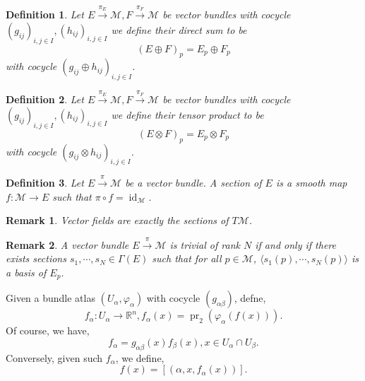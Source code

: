 \documentclass[10pt]{article}
\newtheorem{definition}{Definition}[section]
\newtheorem{remark}{Remark}[section]
\DeclareMathOperator{\pr}{pr}
\DeclareMathOperator{\id}{id}
\newcommand{\R}[0]{\mathbb{R}}
\newcommand{\M}[0]{\mathcal{M}}
\begin{document}
\begin{definition}
  Let $E\stackrel{\pi_E}{\to}\M,F\stackrel{\pi_F}{\to}\M$ be vector bundles with cocycle $(g_{ij})_{i,j\in I},(h_{ij})_{i,j\in I}$ we define their direct sum to be 
  \begin{equation*}
    (E\oplus F)_p = E_p\oplus F_p
  \end{equation*}
  with cocycle $(g_{ij}\oplus h_{ij})_{i,j\in I}$. 
\end{definition}

\begin{definition}
  Let $E\stackrel{\pi_E}{\to}\M,F\stackrel{\pi_F}{\to}\M$ be vector bundles with cocycle $(g_{ij})_{i,j\in I},(h_{ij})_{i,j\in I}$ we define their tensor product to be 
  \begin{equation*}
    (E\otimes F)_p = E_p\otimes F_p
  \end{equation*}
  with cocycle $(g_{ij}\otimes h_{ij})_{i,j\in I}$. 
\end{definition}

\begin{definition}
  Let $E\stackrel{\pi}{\to}\M$ be a vector bundle. A section of $E$ is a smooth map $f:\M\to E$ such that $\pi\circ f = \id_\M$.
\end{definition}

\begin{remark}
  Vector fields are exactly the sections of $T\M$.
\end{remark}

\begin{remark}
  A vector bundle $E\stackrel{\pi}{\to}\M$ is trivial of rank $N$ if and only if there exists sections $s_1,\cdots,s_N\in\Gamma(E)$ such that for all $p\in \M$, $\langle s_1(p),\cdots,s_N(p)\rangle$ is a basis of $E_p$.
\end{remark}


Given a bundle atlas $(U_\alpha,\varphi_\alpha)$ with cocycle $(g_{\alpha\beta})$, defne,
\begin{equation*}
  f_\alpha:U_\alpha \to \R^n, f_\alpha(x) =\pr_2(\varphi_\alpha(f(x))).
\end{equation*}
Of course, we have,
\begin{equation*}
  f_\alpha = g_{\alpha\beta}(x)f_\beta(x), x\in U_\alpha\cap U_\beta.
\end{equation*}
Conversely, given such $f_\alpha$, we define,
\begin{equation*}
f(x) = [(\alpha,x,f_\alpha(x))].
\end{equation*}
\end{document}

